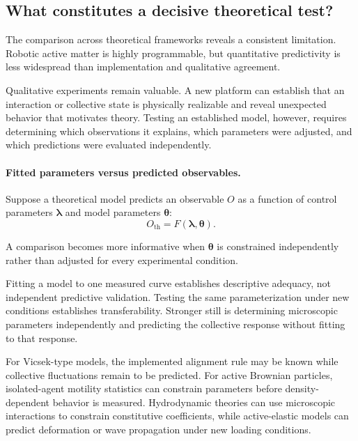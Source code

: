 \subsection{What constitutes a decisive theoretical test?}
\label{sec:theory-decisive}

The comparison across theoretical frameworks
reveals a consistent limitation.
Robotic active matter is highly programmable,
but quantitative predictivity is less
widespread than implementation and
qualitative agreement.

Qualitative experiments remain valuable.
A new platform can establish that an
interaction or collective state is
physically realizable and reveal
unexpected behavior that motivates theory.
Testing an established model, however,
requires determining which observations
it explains, which parameters were
adjusted, and which predictions
were evaluated independently.

\paragraph*{Fitted parameters versus predicted observables.}

Suppose a theoretical model predicts
an observable $O$ as a function of
control parameters $\boldsymbol{\lambda}$
and model parameters $\boldsymbol{\theta}$:
\begin{equation}
O_{\mathrm{th}}
=
F(\boldsymbol{\lambda},
  \boldsymbol{\theta}).
\label{eq:theory-prediction}
\end{equation}

A comparison becomes more informative
when $\boldsymbol{\theta}$ is constrained
independently rather than adjusted
for every experimental condition.

Fitting a model to one measured curve
establishes descriptive adequacy,
not independent predictive validation.
Testing the same parameterization
under new conditions establishes
transferability. Stronger still
is determining microscopic parameters
independently and predicting the
collective response without fitting
to that response.

For Vicsek-type models, the implemented
alignment rule may be known while
collective fluctuations remain to
be predicted. For active Brownian
particles, isolated-agent motility
statistics can constrain parameters
before density-dependent behavior
is measured. Hydrodynamic theories
can use microscopic interactions
to constrain constitutive coefficients,
while active-elastic models can
predict deformation or wave propagation
under new loading conditions.

